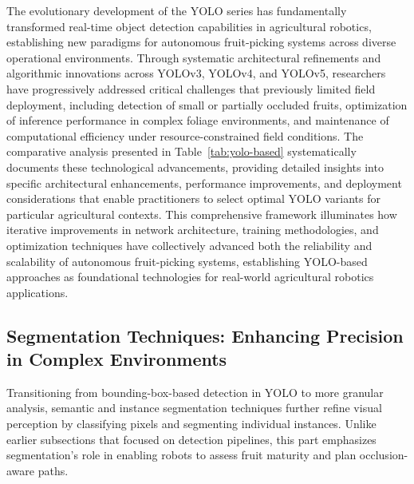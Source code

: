 \documentclass{ieeeaccess}
\begin{document}
The evolutionary development of the YOLO series has fundamentally transformed real-time object detection capabilities in agricultural robotics, establishing new paradigms for autonomous fruit-picking systems across diverse operational environments. Through systematic architectural refinements and algorithmic innovations across YOLOv3, YOLOv4, and YOLOv5, researchers have progressively addressed critical challenges that previously limited field deployment, including detection of small or partially occluded fruits, optimization of inference performance in complex foliage environments, and maintenance of computational efficiency under resource-constrained field conditions. The comparative analysis presented in Table~\ref{tab:yolo-based} systematically documents these technological advancements, providing detailed insights into specific architectural enhancements, performance improvements, and deployment considerations that enable practitioners to select optimal YOLO variants for particular agricultural contexts. This comprehensive framework illuminates how iterative improvements in network architecture, training methodologies, and optimization techniques have collectively advanced both the reliability and scalability of autonomous fruit-picking systems, establishing YOLO-based approaches as foundational technologies for real-world agricultural robotics applications.


\subsection{Segmentation Techniques: Enhancing Precision in Complex Environments}
Transitioning from bounding-box-based detection in YOLO to more granular analysis, semantic and instance segmentation techniques further refine visual perception by classifying pixels and segmenting individual instances. Unlike earlier subsections that focused on detection pipelines, this part emphasizes segmentation's role in enabling robots to assess fruit maturity and plan occlusion-aware paths.
\end{document}
